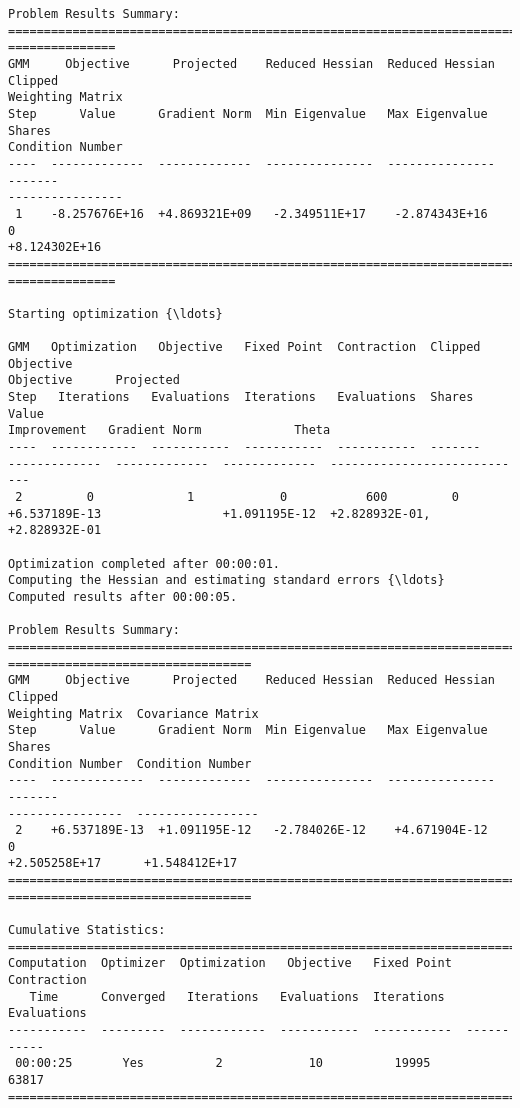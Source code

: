 \begin{Verbatim}[commandchars=\\\{\}]
Problem Results Summary:
================================================================================
===============
GMM     Objective      Projected    Reduced Hessian  Reduced Hessian  Clipped
Weighting Matrix
Step      Value      Gradient Norm  Min Eigenvalue   Max Eigenvalue   Shares
Condition Number
----  -------------  -------------  ---------------  ---------------  -------
----------------
 1    -8.257676E+16  +4.869321E+09   -2.349511E+17    -2.874343E+16      0
+8.124302E+16
================================================================================
===============

Starting optimization {\ldots}

GMM   Optimization   Objective   Fixed Point  Contraction  Clipped    Objective
Objective      Projected
Step   Iterations   Evaluations  Iterations   Evaluations  Shares       Value
Improvement   Gradient Norm             Theta
----  ------------  -----------  -----------  -----------  -------
-------------  -------------  -------------  ----------------------------
 2         0             1            0           600         0
+6.537189E-13                 +1.091195E-12  +2.828932E-01, +2.828932E-01

Optimization completed after 00:00:01.
Computing the Hessian and estimating standard errors {\ldots}
Computed results after 00:00:05.

Problem Results Summary:
================================================================================
==================================
GMM     Objective      Projected    Reduced Hessian  Reduced Hessian  Clipped
Weighting Matrix  Covariance Matrix
Step      Value      Gradient Norm  Min Eigenvalue   Max Eigenvalue   Shares
Condition Number  Condition Number
----  -------------  -------------  ---------------  ---------------  -------
----------------  -----------------
 2    +6.537189E-13  +1.091195E-12   -2.784026E-12    +4.671904E-12      0
+2.505258E+17      +1.548412E+17
================================================================================
==================================

Cumulative Statistics:
===========================================================================
Computation  Optimizer  Optimization   Objective   Fixed Point  Contraction
   Time      Converged   Iterations   Evaluations  Iterations   Evaluations
-----------  ---------  ------------  -----------  -----------  -----------
 00:00:25       Yes          2            10          19995        63817
===========================================================================


\end{Verbatim}

